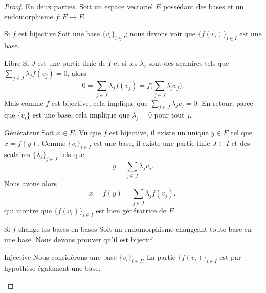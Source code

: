 \begin{proof}
    En deux parties. Soit un espace vectoriel \( E\) possédant des bases et un endomorphisme \( f\colon E\to E\).
    \begin{subproof}
        \item[Si \( f\) est bijective]
            Soit une base \( \{ v_i \}_{i\in I}\); nous devons voir que \( \{ f(v_i) \}_{i\in I}\) est une base.
            \begin{subproof}
                \item[Libre]
                    Si \( J\) est une partie finie de \( I\) et si les \( \lambda_j\) sont des scalaires tels que \( \sum_{j\in J}\lambda_jf(v_j)=0\), alors
                    \begin{equation}
                        0=\sum_{j\in J}\lambda_jf(v_j)=f\big( \sum_{j\in J}\lambda_jv_j \big).
                    \end{equation}
                    Mais comme \( f\) est bijective, cela implique que \( \sum_{j\in J}\lambda_jv_j=0\). En retour, parce que \( \{ v_i \}\) est une base, cela implique que \( \lambda_j=0\) pour tout \( j\).
                \item[Générateur]
                    Soit \( x\in E\). Vu que \( f\) est bijective, il existe un unique \( y\in E\) tel que \( x=f(y)\). Comme \( \{ v_i \}_{i\in I}\) est une base, il existe une partie finie \( J\subset I\) et des scalaires \( \{ \lambda_j \}_{j\in J}\) tels que
                    \begin{equation}
                        y=\sum_{j\in J}\lambda_jv_j.
                    \end{equation}
                    Nous avons alors
                    \begin{equation}
                        x=f(y)=\sum_{j\in J}\lambda_jf(v_j),
                    \end{equation}
                    qui montre que \( \{ f(v_i) \}_{i\in I}\) est bien génératrice de \( E\)
            \end{subproof}
        \item[Si \( f\) change les bases en bases]
            Soit un endomorphisme changeant toute base en une base. Nous devons prouver qu'il est bijectif.
            \begin{subproof}
                \item[Injective]
                    Nous considérons une base \( \{ v_i \}_{i\in I}\). La partie \( \{ f(v_i) \}_{i\in I}\) est par hypothèse également une base.


\end{subproof}
\end{subproof}
\end{proof}
